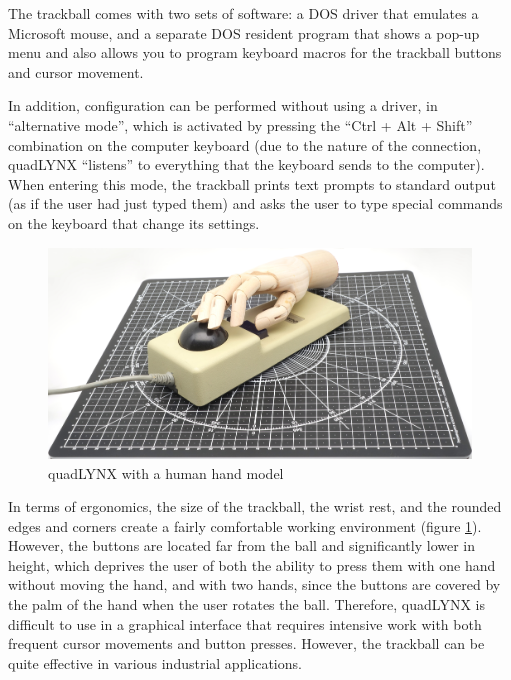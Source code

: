 \documentclass[11pt, a4paper]{article}
\begin{document}
The trackball comes with two sets of software: a DOS driver that emulates a Microsoft mouse, and a separate DOS resident program that shows a pop-up menu and also allows you to program keyboard macros for the trackball buttons and cursor movement.

In addition, configuration can be performed without using a driver, in “alternative mode”, which is activated by pressing the “Ctrl + Alt + Shift” combination on the computer keyboard (due to the nature of the connection, quadLYNX “listens” to everything that the keyboard sends to the computer). When entering this mode, the trackball prints text prompts to standard output (as if the user had just typed them) and asks the user to type special commands on the keyboard that change its settings.

\begin{figure}[h]
    \centering
    \includegraphics[scale=0.4]{1986_honeywell_asher_quadlynx_trackball/hand_30.jpg}
    \caption{quadLYNX with a human hand model}
    \label{fig:quadLYNXHand}
\end{figure}

In terms of ergonomics, the size of the trackball, the wrist rest, and the rounded edges and corners create a fairly comfortable working environment (figure \ref{fig:quadLYNXHand}). However, the buttons are located far from the ball and significantly lower in height, which deprives the user of both the ability to press them with one hand without moving the hand, and with two hands, since the buttons are covered by the palm of the hand when the user rotates the ball. Therefore, quadLYNX is difficult to use in a graphical interface that requires intensive work with both frequent cursor movements and button presses. However, the trackball can be quite effective in various industrial applications.
\end{document}

